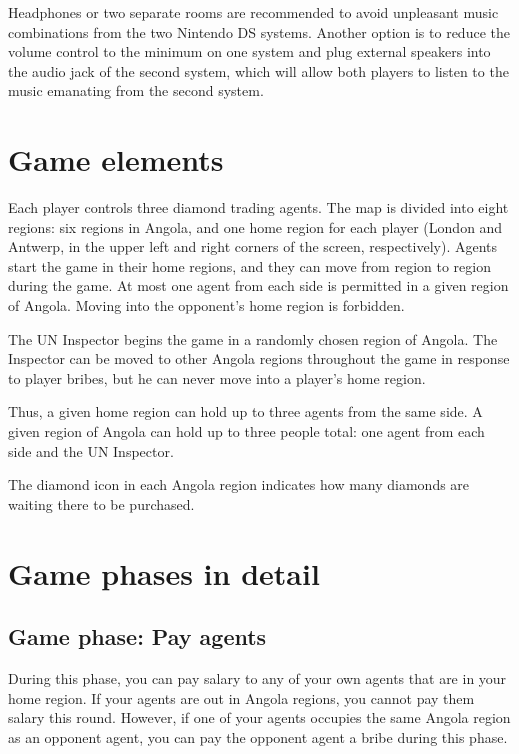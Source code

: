 \documentclass[8pt]{extbook}
\begin{document}
Headphones or two separate rooms are recommended to avoid unpleasant music combinations from the two Nintendo DS systems.  Another option is to reduce the volume control to the minimum on one system and plug external speakers into the audio jack of the second system, which will allow both players to listen to the music emanating from the second system.









\section{Game elements}

Each player controls three diamond trading agents.  The map is divided into eight regions:  six regions in Angola, and one home region for each player (London and Antwerp, in the upper left and right corners of the screen, respectively).  Agents start the game in their home regions, and they can move from region to region during the game.  At most one agent from each side is permitted in a given region of Angola.  Moving into the opponent's home region is forbidden.

The UN Inspector begins the game in a randomly chosen region of Angola.  The Inspector can be moved to other Angola regions throughout the game in response to player bribes, but he can never move into a player's home region.

Thus, a given home region can hold up to three agents from the same side.  A given region of Angola can hold up to three people total:  one agent from each side and the UN Inspector.

The diamond icon in each Angola region indicates how many diamonds are waiting there to be purchased.




\section{Game phases in detail}

\subsection{Game phase:  Pay agents}
\label{sec:payPhase}

During this phase, you can pay salary to any of your own agents that are in your home region.  If your agents are out in Angola regions, you cannot pay them salary this round.  However, if one of your agents occupies the same Angola region as an opponent agent, you can pay the opponent agent a bribe during this phase.
\end{document}
